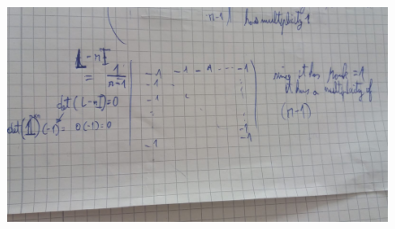 \documentclass[14pt]{article}
\begin{document}
\begin{description}
\begin{figure}[h]
\end{figure}
\begin{figure}[h]
  \includegraphics[scale=0.35, angle=90]{a10-ex1-b6.jpeg}
\end{figure}


\end{description}
\end{document}
